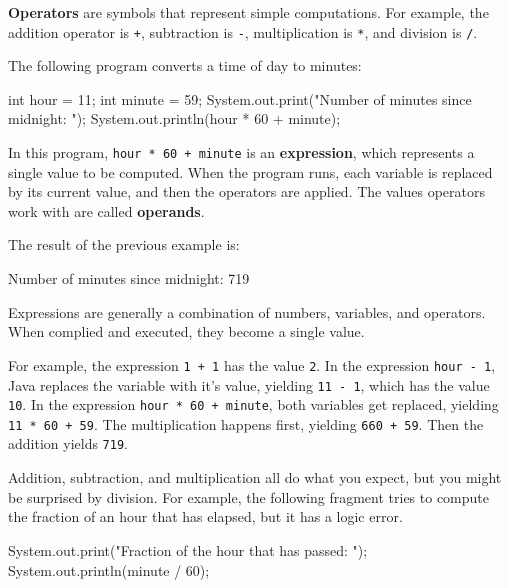\documentclass[12pt]{book}
\theoremstyle{exercise}
\newcommand{\java}[1]{\verb"#1"}
\begin{document}

{\bf Operators} are symbols that represent simple computations.
For example, the addition operator is \java{+}, subtraction is \java{-}, multiplication is \java{*}, and division is \java{/}.

The following program converts a time of day to minutes:

\begin{code}
    int hour = 11;
    int minute = 59;
    System.out.print("Number of minutes since midnight: ");
    System.out.println(hour * 60 + minute);
\end{code}


In this program, \java{hour * 60 + minute} is an {\bf expression}, which represents a single value to be computed.
When the program runs, each variable is replaced by its current value, and then the operators are applied.
The values operators work with are called {\bf operands}.

The result of the previous example is:

\begin{stdout}
Number of minutes since midnight: 719
\end{stdout}

Expressions are generally a combination of numbers, variables, and operators.
When complied and executed, they become a single value.

For example, the expression \java{1 + 1} has the value \java{2}.
In the expression \java{hour - 1}, Java replaces the variable with it's value, yielding \java{11 - 1}, which has the value \java{10}.
In the expression \java{hour * 60 + minute}, both variables get replaced, yielding \java{11 * 60 + 59}.
The multiplication happens first, yielding \java{660 + 59}.
Then the addition yields \java{719}.

Addition, subtraction, and multiplication all do what you expect, but you might be surprised by division.
For example, the following fragment tries to compute the fraction of an hour that has elapsed, but it has a logic error.

\begin{code}
    System.out.print("Fraction of the hour that has passed: ");
    System.out.println(minute / 60);
\end{code}
\end{document}
